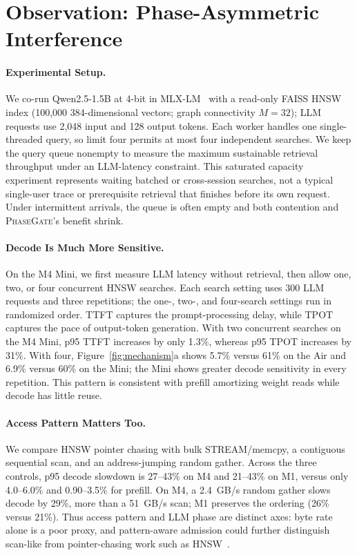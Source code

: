 \documentclass{article}
\newcommand{\system}{\textsc{PhaseGate}\xspace}
\begin{document}
\section{Observation: Phase-Asymmetric Interference}
\label{sec:observation}

\paragraph{Experimental Setup.}
We co-run Qwen2.5-1.5B at 4-bit in MLX-LM~\cite{qwen2025} with a read-only FAISS HNSW index (100,000 384-dimensional vectors; graph connectivity $M=32$); LLM requests use 2,048 input and 128 output tokens.
Each worker handles one single-threaded query, so limit four permits at most four independent searches.
We keep the query queue nonempty to measure the maximum sustainable retrieval throughput under an LLM-latency constraint.
This saturated capacity experiment represents waiting batched or cross-session searches, not a typical single-user trace or prerequisite retrieval that finishes before its own request.
Under intermittent arrivals, the queue is often empty and both contention and \system's benefit shrink.

\paragraph{Decode Is Much More Sensitive.}
On the M4 Mini, we first measure LLM latency without retrieval, then allow one, two, or four concurrent HNSW searches.
Each search setting uses 300 LLM requests and three repetitions; the one-, two-, and four-search settings run in randomized order.
TTFT captures the prompt-processing delay, while TPOT captures the pace of output-token generation.
With two concurrent searches on the M4 Mini, p95 TTFT increases by only 1.3\%, whereas p95 TPOT increases by 31\%.
With four, Figure~\ref{fig:mechanism}a shows 5.7\% versus 61\% on the Air and 6.9\% versus 60\% on the Mini; the Mini shows greater decode sensitivity in every repetition.
This pattern is consistent with prefill amortizing weight reads while decode has little reuse.

\paragraph{Access Pattern Matters Too.}
We compare HNSW pointer chasing with bulk STREAM/\allowbreak memcpy, a contiguous sequential scan, and an address-jumping random gather.
Across the three controls, p95 decode slowdown is 27--43\% on M4 and 21--43\% on M1, versus only 4.0--6.0\% and 0.90--3.5\% for prefill.
On M4, a 2.4~GB/s random gather slows decode by 29\%, more than a 51~GB/s scan; M1 preserves the ordering (26\% versus 21\%).
Thus access pattern and LLM phase are distinct axes: byte rate alone is a poor proxy, and pattern-aware admission could further distinguish scan-like from pointer-chasing work such as HNSW~\cite{malkov2020hnsw}.
\end{document}
